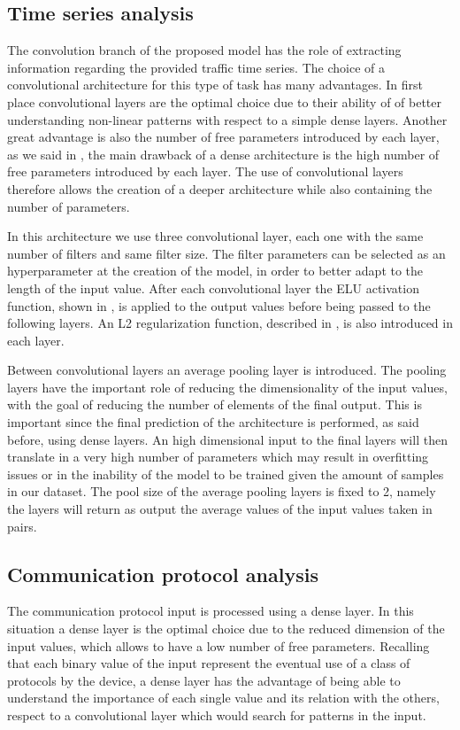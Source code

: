 \subsection{Time series analysis}

The convolution branch of the proposed model has the role of extracting information regarding the provided traffic time series. The choice of a convolutional architecture for this type of task has many advantages. In first place convolutional layers are the optimal choice due to their ability of of better understanding non-linear patterns with respect to a simple dense layers. Another great advantage is also the number of free parameters introduced by each layer, as we said in , the main drawback of a dense architecture is the high number of free parameters introduced by each layer. The use of convolutional layers therefore allows the creation of a deeper architecture while also containing the number of parameters.

In this architecture we use three convolutional layer, each one with the same number of filters and same filter size. The filter parameters can be selected as an hyperparameter at the creation of the model, in order to better adapt to the length of the input value. After each convolutional layer the ELU activation function, shown in , is applied to the output values before being passed to the following layers. An L2 regularization function, described in , is also introduced in each layer.

Between convolutional layers an average pooling layer is introduced. The pooling layers have the important role of reducing the dimensionality of the input values, with the goal of reducing the number of elements of the final output. This is important since the final prediction of the architecture is performed, as said before, using dense layers. An high dimensional input to the final layers will then translate in a very high number of parameters which may result in overfitting issues or in the inability of the model to be trained given the amount of samples in our dataset. The pool size of the average pooling layers is fixed to 2, namely the layers will return as output the average values of the input values taken in pairs.

\subsection{Communication protocol analysis}
The communication protocol input is processed using a dense layer. In this situation a dense layer is the optimal choice due to the reduced dimension of the input values, which allows to have a low number of free parameters. Recalling that each binary value of the input represent the eventual use of a class of protocols by the device, a dense layer has the advantage of being able to understand the importance of each single value and its relation with the others, respect to a convolutional layer which would search for patterns in the input.

